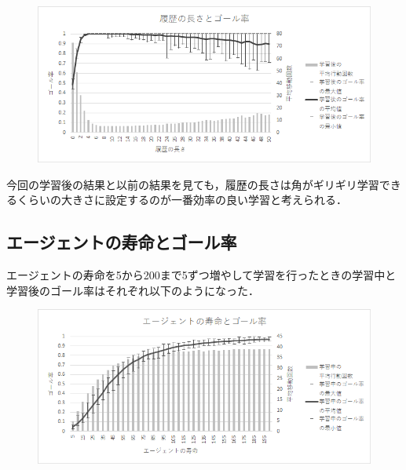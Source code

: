 \documentclass[a4j,11pt]{jarticle}
\begin{document}
\begin{figure}[ht]
  \begin{center}
    \includegraphics[scale=1.5]{img/valT10.png}
  \end{center}
\end{figure}

今回の学習後の結果と以前の結果を見ても，履歴の長さは角がギリギリ学習できるくらいの大きさに設定するのが一番効率の良い学習と考えられる．

\newpage

\subsection{エージェントの寿命とゴール率}

エージェントの寿命を5から200まで5ずつ増やして学習を行ったときの学習中と学習後のゴール率はそれぞれ以下のようになった．

\begin{figure}[ht]
  \begin{center}
    \includegraphics[scale=1.5]{img/changeAgentLifetime10.png}
  \end{center}
\end{figure}
\end{document}
